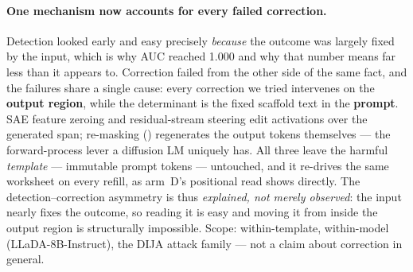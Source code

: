 \paragraph{One mechanism now accounts for every failed correction.} Detection looked
early and easy precisely \emph{because} the outcome was largely fixed by the input,
which is why AUC reached 1.000 and why that number means far less than it appears to.
Correction failed from the other side of the same fact, and the failures share a single
cause: every correction we tried intervenes on the \textbf{output region}, while the
determinant is the fixed scaffold text in the \textbf{prompt}. SAE feature zeroing and
residual-stream steering edit activations over the generated span; re-masking
() regenerates the output tokens themselves --- the forward-process
lever a diffusion LM uniquely has. All three leave the harmful \emph{template} ---
immutable prompt tokens --- untouched, and it re-drives the same worksheet on every
refill, as arm~D's positional read shows directly. The detection--correction asymmetry
is thus \emph{explained, not merely observed}: the input nearly fixes the outcome, so
reading it is easy and moving it from inside the output region is structurally
impossible. Scope: within-template, within-model (LLaDA-8B-Instruct), the DIJA attack
family --- not a claim about correction in general.

